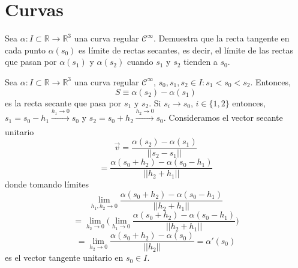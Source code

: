 
\chapter{Curvas}

\begin{ejr}[25]
  Sea $\alpha: I \subset \mathbb{R} \to \mathbb{R}^{3}$ una curva regular $\mathcal{C}^{\infty}$. Demuestra que la recta tangente en cada punto $\alpha(s_{0})$ es límite de rectas secantes, es decir, el límite de las rectas que pasan por $\alpha(s_{1})$ y $\alpha(s_{2})$ cuando $s_{1}$ y $s_{2}$ tienden a $s_{0}$.
\end{ejr}

\begin{sol}[25]
  Sea $\alpha: I \subset \mathbb{R} \to \mathbb{R}^{3}$ una curva regular $\mathcal{C}^{\infty}$, $s_{0}, s_{1}, s_{2} \in I : s_{1} < s_{0} < s_{2}$. Entonces,
  \[ 
    S \equiv \alpha(s_{2}) - \alpha(s_{1})
  \] 
  es la recta secante que pasa por $s_{1}$ y $s_{2}$. Si $s_{i} \rightarrow s_{0}$, $i \in \{ 1, 2 \}$ entonces, $s_{1} = s_{0} - h_{1} \xrightarrow[]{ h_{1} \rightarrow 0 } s_{0}$ y $s_{2} = s_{0} + h_{2} \xrightarrow[]{ h_{2} \rightarrow 0 } s_{0}$. Consideramos el vector secante unitario
  \[ 
    \vec{v} = \frac{\alpha(s_{2}) - \alpha(s_{1})}{||s_{2} - s_{1}||}
  \]
  \[ 
    = \frac{\alpha(s_{0} + h_{2}) - \alpha(s_{0} - h_{1})}{||h_{2} + h_{1}||}
  \] 
  donde tomando límites
  \[ 
    \lim_{h_{1},h_{2} \to 0} \frac{\alpha(s_{0} + h_{2}) - \alpha(s_{0} - h_{1})}{||h_{2} + h_{1}||} 
  \] 
  \[ 
     = \lim_{h_{2} \to 0} \Big ( \lim_{h_{1} \to 0} \frac{\alpha(s_{0} + h_{2}) - \alpha(s_{0} - h_{1})}{||h_{2} + h_{1}||} \Big )
  \] 
  \[ 
    = \lim_{h_{2} \to 0} \frac{\alpha(s_{0} + h_{2}) - \alpha(s_{0})}{||h_{2}||} = \alpha'(s_0)
  \] 
  es el vector tangente unitario en $s_{0} \in I$.

\end{sol}
